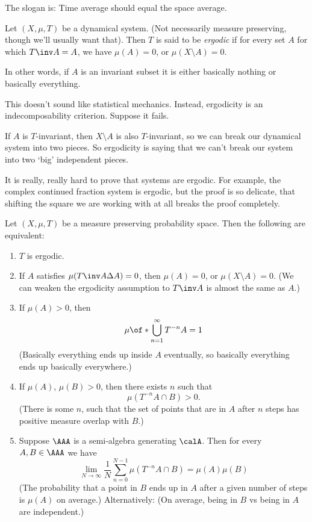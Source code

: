 \documentclass{article}
\theoremstyle{remark}
\begin{document}
The slogan is: Time average should equal the space average.

\begin{definition}
Let $(X,\mu,T)$ be a dynamical system. (Not necessarily
measure preserving, though we'll usually want that).
Then $T$ is said to be \emph{ergodic} if for every
set $A$ for which $T\inv A = A$, we have
$\mu(A)=0$, or $\mu(X\setminus A) = 0$.

In other words, if $A$ is an invariant subset 
it is either basically nothing
or basically everything.
\end{definition}

This doesn't sound like statistical mechanics.
Instead, ergodicity is an indecomposability criterion.
Suppose it fails.

If $A$ is $T$-invariant, then $X\setminus A$ is also
$T$-invariant, so we can break our dynamical
system into two pieces. So ergodicity is saying that
we can't break our system into two `big' independent
pieces.

It is really, really hard to prove that systems are 
ergodic. For example, the complex continued fraction
system is ergodic, but the proof is so delicate,
that shifting the square we are working with at all
breaks the proof completely.

\begin{proposition}
    Let $(X,\mu,T)$ be a measure preserving probability
    space. Then the following are equivalent:
    \begin{enumerate}
        \item $T$ is ergodic.
        \item If $A$ satisfies 
            $\mu(T\inv A\Delta A) = 0$,
            then $\mu(A)=0$, or $\mu(X\setminus A)=0$.
            (We can weaken the ergodicity assumption
            to $T\inv A$ is almost the same as $A$.)
        \item If $\mu(A) > 0$, then 
            \[ \mu\of*{\bigcup_{n=1}^\infty T^{-n} A} = 1
            \]
            (Basically everything ends up inside $A$
            eventually, so basically everything
            ends up basically everywhere.)
        \item If $\mu(A)$, $\mu(B)>0$, then 
            there exists $n$ such that 
            \[\mu(T^{-n}A \cap B) > 0.\]
            (There is some $n$, such that the set 
            of points that are in $A$ after $n$
            steps has positive measure overlap
            with $B$.)
        \item Suppose $\AAA$ is a semi-algebra
            generating $\calA$. Then for every 
            $A,B\in\AAA$ we have 
            \[\lim_{N\to\infty} \frac{1}{N} 
            \sum_{n=0}^{N-1} \mu(T^{-n}A\cap B)
            = \mu(A)\mu(B)
            \]
            (The probability that a point in $B$
            ends up in $A$ after a given number of steps
            is $\mu(A)$ on average.)
            Alternatively: (On average, being in $B$
            vs being in $A$ are independent.)
    \end{enumerate}
\end{proposition}
\end{document}
